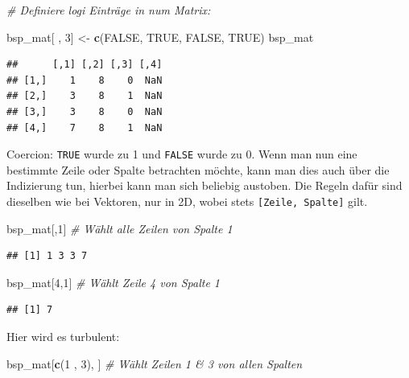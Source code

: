 \documentclass[
  ngerman,
]{book}
\newenvironment{Shaded}{\begin{snugshade}}{\end{snugshade}}
\newcommand{\CommentTok}[1]{\textcolor[rgb]{0.56,0.35,0.01}{\textit{#1}}}
\newcommand{\ConstantTok}[1]{\textcolor[rgb]{0.56,0.35,0.01}{#1}}
\newcommand{\DecValTok}[1]{\textcolor[rgb]{0.00,0.00,0.81}{#1}}
\newcommand{\FunctionTok}[1]{\textcolor[rgb]{0.13,0.29,0.53}{\textbf{#1}}}
\newcommand{\NormalTok}[1]{#1}
\newcommand{\OtherTok}[1]{\textcolor[rgb]{0.56,0.35,0.01}{#1}}
\begin{document}
\begin{Shaded}
\begin{Highlighting}[]
\CommentTok{\# Definiere \textasciigrave{}logi\textasciigrave{} Einträge in \textasciigrave{}num\textasciigrave{} Matrix:}

\NormalTok{bsp\_mat[ , }\DecValTok{3}\NormalTok{] }\OtherTok{\textless{}{-}} \FunctionTok{c}\NormalTok{(}\ConstantTok{FALSE}\NormalTok{, }\ConstantTok{TRUE}\NormalTok{, }\ConstantTok{FALSE}\NormalTok{, }\ConstantTok{TRUE}\NormalTok{)}
\NormalTok{bsp\_mat}
\end{Highlighting}
\end{Shaded}

\begin{verbatim}
##      [,1] [,2] [,3] [,4]
## [1,]    1    8    0  NaN
## [2,]    3    8    1  NaN
## [3,]    3    8    0  NaN
## [4,]    7    8    1  NaN
\end{verbatim}

Coercion: \texttt{TRUE} wurde zu 1 und \texttt{FALSE} wurde zu 0. Wenn man nun eine bestimmte Zeile oder Spalte betrachten möchte, kann man dies auch über die Indizierung tun, hierbei kann man sich beliebig austoben. Die Regeln dafür sind dieselben wie bei Vektoren, nur in 2D, wobei stets \texttt{{[}Zeile,\ Spalte{]}} gilt.

\begin{Shaded}
\begin{Highlighting}[]
\NormalTok{bsp\_mat[,}\DecValTok{1}\NormalTok{]   }\CommentTok{\# Wählt alle Zeilen von Spalte 1}
\end{Highlighting}
\end{Shaded}

\begin{verbatim}
## [1] 1 3 3 7
\end{verbatim}

\begin{Shaded}
\begin{Highlighting}[]
\NormalTok{bsp\_mat[}\DecValTok{4}\NormalTok{,}\DecValTok{1}\NormalTok{]  }\CommentTok{\# Wählt Zeile 4 von Spalte 1}
\end{Highlighting}
\end{Shaded}

\begin{verbatim}
## [1] 7
\end{verbatim}

Hier wird es turbulent:

\begin{Shaded}
\begin{Highlighting}[]
\NormalTok{bsp\_mat[}\FunctionTok{c}\NormalTok{(}\DecValTok{1}\NormalTok{ , }\DecValTok{3}\NormalTok{), ] }\CommentTok{\# Wählt Zeilen 1 \& 3 von allen Spalten}
\end{Highlighting}
\end{Shaded}
\end{document}
